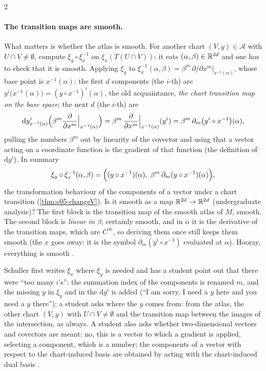 \begin{paracol}{2}
\paragraph{The transition maps are smooth.} What matters is whether the atlas is smooth. For another chart $(V,y)\in\mathcal A$ with $U\cap V\neq\emptyset$, compute $\xi_y\circ\xi_x^{-1}$ on $\xi_x(T(U\cap V))$: it eats $(\alpha,\beta)\in\mathbb{R}^{2d}$ and one has to check that it is smooth. Applying $\xi_y$ to $\xi_x^{-1}(\alpha,\beta)=\beta^m\,\partial/\partial x^m|_{x^{-1}(\alpha)}$, whose base point is $x^{-1}(\alpha)$:
the first $d$ components (the $i$-th) are $y^i\bigl(x^{-1}(\alpha)\bigr)=(y\circ x^{-1})^i(\alpha)$, the old acquaintance, \emph{the chart transition map on the base space}; the next $d$ (the $i$-th) are
\[
  \mathrm dy^i_{x^{-1}(\alpha)}\Bigl(\beta^m\frac{\partial}{\partial x^m}\Big|_{x^{-1}(\alpha)}\Bigr)=\beta^m\,\frac{\partial}{\partial x^m}\Big|_{x^{-1}(\alpha)}(y^i)=\beta^m\,\partial_m\bigl(y^i\circ x^{-1}\bigr)(\alpha),
\]
pulling the numbers $\beta^m$ out by linearity of the covector and using that a vector acting on a coordinate function is the gradient of that function (the definition of $\mathrm dy^i$). In summary
\[
  \xi_y\circ\xi_x^{-1}(\alpha,\beta)=\Bigl((y\circ x^{-1})(\alpha),\;\beta^m\,\partial_m(y\circ x^{-1})(\alpha)\Bigr),
\]
the transformation behaviour of the components of a vector under a chart transition (\cref{thm:c05-changeV}). Is it smooth as a map $\mathbb{R}^{2d}\to\mathbb{R}^{2d}$ (undergraduate analysis)? The first block is the transition map of the smooth atlas of $M$, smooth. The second block is \emph{linear in $\beta$}, certainly smooth, and in $\alpha$ it is the derivative of the transition maps, which are $C^\infty$, so deriving them once still keeps them smooth (the $x$ goes away: it is the symbol $\partial_m(y^i\circ x^{-1})$ evaluated at $\alpha$).
Hooray, everything is smooth .
\begin{coursenote}
Schuller first writes $\xi_x$ where $\xi_y$ is needed and has a student point out that there were ``too many $i$'s'': the summation index of the components is renamed $m$, and the missing $y$ in $\xi_y$ and in the $\mathrm dy^i$ is added (``I am sorry, I need a $y$ here and you need a $y$ there''); a student asks where the $y$ comes from: from the atlas, the other chart $(V,y)$ with $U\cap V\neq\emptyset$ and the transition map between the images of the intersection, as always. A student also asks whether two-dimensional vectors and covectors are meant: no, this is a vector to which a gradient is applied, selecting a component, which is a number; the components of a vector with respect to the chart-induced basis are obtained by acting with the chart-induced dual basis
.
\end{coursenote}


\end{paracol}
